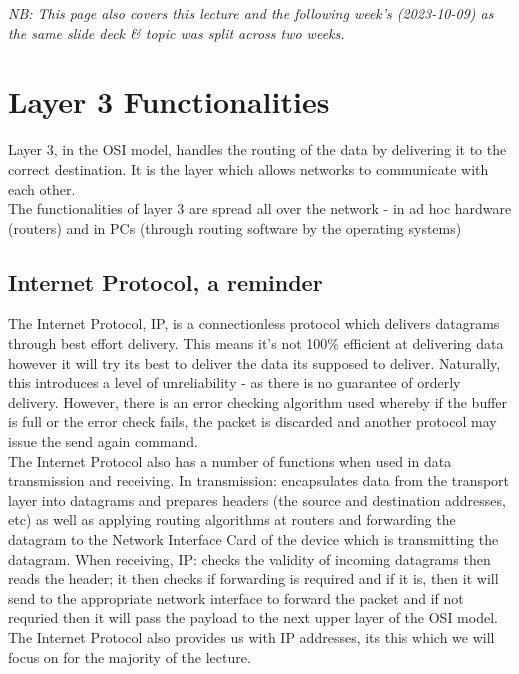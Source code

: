 
\textit{NB: This page also covers this lecture and the following week's (2023-10-09) as the same slide deck \& topic was split across two weeks.}

\section{Layer 3 Functionalities}
Layer 3, in the OSI model, handles the routing of the data by delivering it to the correct destination. It is the layer which allows networks to communicate with each other.\\

The functionalities of layer 3 are spread all over the network - in ad hoc hardware (routers) and in PCs (through routing software by the operating systems)

\subsection{Internet Protocol, a reminder}
The Internet Protocol, IP, is a connectionless protocol which delivers datagrams through best effort delivery. This means it's not 100\% efficient at delivering data however it will try its best to deliver the data its supposed to deliver. Naturally, this introduces a level of unreliability - as there is no guarantee of orderly delivery. However, there is an error checking algorithm used whereby if the buffer is full or the error check fails, the packet is discarded and another protocol may issue the send again command.\\

The Internet Protocol also has a number of functions when used in data transmission and receiving. In transmission: encapsulates data from the transport layer into datagrams and prepares headers (the source and destination addresses, etc) as well as applying routing algorithms at routers and forwarding the datagram to the Network Interface Card of the device which is transmitting the datagram. When receiving, IP: checks the validity of incoming datagrams then reads the header; it then checks if forwarding is required and if it is, then it will send to the appropriate network interface to forward the packet and if not requried then it will pass the payload to the next upper layer of the OSI model.\\

The Internet Protocol also provides us with IP addresses, its this which we will focus on for the majority of the lecture.

